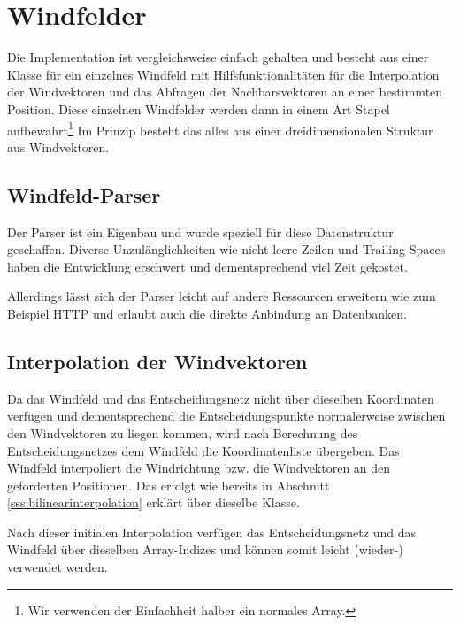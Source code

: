 \section{Windfelder}
Die Implementation ist vergleichsweise einfach gehalten und besteht aus einer
Klasse für ein einzelnes Windfeld mit Hilfsfunktionalitäten für die
Interpolation der Windvektoren und das Abfragen der Nachbarsvektoren an einer
bestimmten Position. Diese einzelnen Windfelder werden dann in einem Art Stapel
aufbewahrt\footnote{Wir verwenden der Einfachheit halber ein normales Array.}
Im Prinzip besteht das alles aus einer dreidimensionalen Struktur aus
Windvektoren.

\subsection{Windfeld-Parser}
Der Parser ist ein Eigenbau und wurde speziell für diese Datenstruktur
geschaffen. Diverse Unzulänglichkeiten wie nicht-leere Zeilen und Trailing
Spaces haben die Entwicklung erschwert und dementsprechend viel Zeit gekostet.

Allerdings lässt sich der Parser leicht auf andere Ressourcen erweitern wie zum
Beispiel HTTP und erlaubt auch die direkte Anbindung an Datenbanken.

\subsection{Interpolation der Windvektoren}
Da das Windfeld und das Entscheidungsnetz nicht über dieselben Koordinaten
verfügen und dementsprechend die Entscheidungspunkte normalerweise zwischen den
Windvektoren zu liegen kommen, wird nach Berechnung des Entscheidungsnetzes dem
Windfeld die Koordinatenliste übergeben. Das Windfeld interpoliert die
Windrichtung bzw. die Windvektoren an den geforderten Positionen. Das erfolgt
wie bereits in Abschnitt \ref{sss:bilinearinterpolation} erklärt über dieselbe
Klasse.

Nach dieser initialen Interpolation verfügen das Entscheidungsnetz und das
Windfeld über dieselben Array-Indizes und können somit leicht (wieder-)
verwendet werden.
